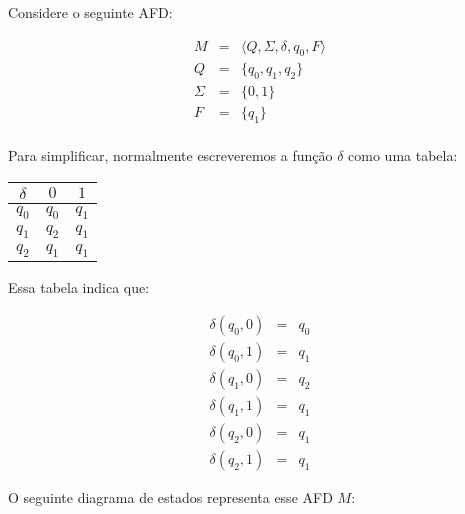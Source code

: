 \begin{example}
  Considere o seguinte AFD:

  \begin{eqnarray*}
    M & = & \langle Q, \Sigma, \delta, q_0, F \rangle\\
    Q & = & \{q_0, q_1, q_2\}\\
    \Sigma & = & \{0,1\}\\
    F & = & \{q_1\}\\
  \end{eqnarray*}

  Para simplificar, normalmente escreveremos a função $\delta$ como uma tabela:

  \begin{center}
  \begin{tabular}{c|cc}
    $\delta$ & $0$ & $1$ \\
    \hline
    $q_0$ & $q_0$ & $q_1$\\
    $q_1$ & $q_2$ & $q_1$\\
    $q_2$ & $q_1$ & $q_1$\\
  \end{tabular}
  \end{center}

Essa tabela indica que:

\begin{eqnarray*}
  \delta(q_0, 0) & = & q_0\\
  \delta(q_0, 1) & = & q_1\\
  \delta(q_1, 0) & = & q_2\\
  \delta(q_1, 1) & = & q_1\\
  \delta(q_2, 0) & = & q_1\\
  \delta(q_2, 1) & = & q_1
\end{eqnarray*}

O seguinte diagrama de estados representa esse AFD $M$:

\begin{center}
\end{center}
\end{example}

